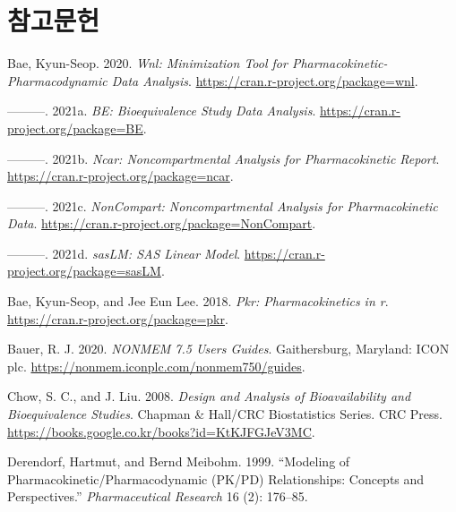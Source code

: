\documentclass[
  11pt,
  krantz2, a4paper, twoside]{krantz}
\newlength{\cslhangindent}
\newlength{\cslentryspacingunit} %
\newenvironment{CSLReferences}[2] %
 {%
  \setlength{\parindent}{0pt}
  \ifodd #1
  \let\oldpar\par
  \def\par{\hangindent=\cslhangindent\oldpar}
  \fi
  \setlength{\parskip}{#2\cslentryspacingunit}
 }%
 {}
\theoremstyle{definition}
\theoremstyle{definition}
\theoremstyle{definition}
\theoremstyle{definition}
\theoremstyle{remark}
\begin{document}
\normalsize

\backmatter

\hypertarget{uxcc38uxace0uxbb38uxd5cc}{%
\chapter*{참고문헌}\label{uxcc38uxace0uxbb38uxd5cc}}


\hypertarget{refs}{}
\begin{CSLReferences}{1}{0}
\leavevmode{}%
Bae, Kyun-Seop. 2020. \emph{Wnl: Minimization Tool for Pharmacokinetic-Pharmacodynamic Data Analysis}. \url{https://cran.r-project.org/package=wnl}.

\leavevmode{}%
---------. 2021a. \emph{BE: Bioequivalence Study Data Analysis}. \url{https://cran.r-project.org/package=BE}.

\leavevmode{}%
---------. 2021b. \emph{Ncar: Noncompartmental Analysis for Pharmacokinetic Report}. \url{https://cran.r-project.org/package=ncar}.

\leavevmode{}%
---------. 2021c. \emph{NonCompart: Noncompartmental Analysis for Pharmacokinetic Data}. \url{https://cran.r-project.org/package=NonCompart}.

\leavevmode{}%
---------. 2021d. \emph{sasLM: SAS Linear Model}. \url{https://cran.r-project.org/package=sasLM}.

\leavevmode{}%
Bae, Kyun-Seop, and Jee Eun Lee. 2018. \emph{Pkr: Pharmacokinetics in r}. \url{https://cran.r-project.org/package=pkr}.

\leavevmode{}%
Bauer, R. J. 2020. \emph{NONMEM 7.5 Users Guides}. Gaithersburg, Maryland: ICON plc. \url{https://nonmem.iconplc.com/nonmem750/guides}.

\leavevmode{}%
Chow, S. C., and J. Liu. 2008. \emph{Design and Analysis of Bioavailability and Bioequivalence Studies}. Chapman \& Hall/CRC Biostatistics Series. CRC Press. \url{https://books.google.co.kr/books?id=KtKJFGJeV3MC}.

\leavevmode{}%
Derendorf, Hartmut, and Bernd Meibohm. 1999. {``Modeling of Pharmacokinetic/Pharmacodynamic (PK/PD) Relationships: Concepts and Perspectives.''} \emph{Pharmaceutical Research} 16 (2): 176--85.


\end{CSLReferences}
\end{document}
